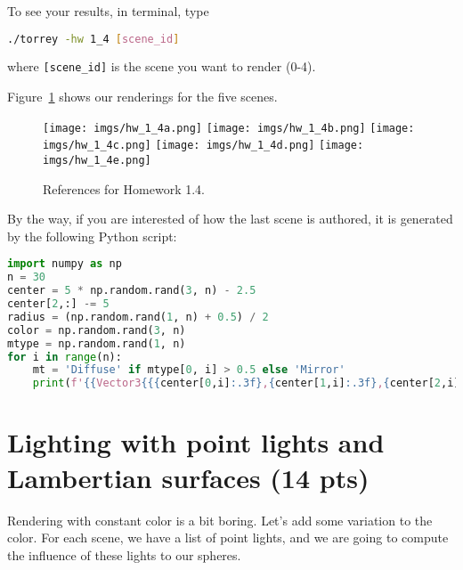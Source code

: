 To see your results, in terminal, type
\begin{lstlisting}[language=bash]
  ./torrey -hw 1_4 [scene_id]
\end{lstlisting}
where \lstinline{[scene_id]} is the scene you want to render (0-4).

Figure~\ref{fig:hw_1_4} shows our renderings for the five scenes.

\begin{figure}[ht]
    \centering
    \texttt{[image: imgs/hw\_1\_4a.png]}
    \texttt{[image: imgs/hw\_1\_4b.png]}
    \texttt{[image: imgs/hw\_1\_4c.png]}
    \texttt{[image: imgs/hw\_1\_4d.png]}
    \texttt{[image: imgs/hw\_1\_4e.png]}
    \caption{References for Homework 1.4.}
    \label{fig:hw_1_4}
\end{figure}

By the way, if you are interested of how the last scene is authored, it is generated by the following Python script:
\begin{lstlisting}[language=Python]
import numpy as np
n = 30
center = 5 * np.random.rand(3, n) - 2.5
center[2,:] -= 5
radius = (np.random.rand(1, n) + 0.5) / 2
color = np.random.rand(3, n)
mtype = np.random.rand(1, n)
for i in range(n):
    mt = 'Diffuse' if mtype[0, i] > 0.5 else 'Mirror'
    print(f'{{Vector3{{{center[0,i]:.3f},{center[1,i]:.3f},{center[2,i]:.3f}}}, {radius[0, i]:.3f}, Vector3{{{color[0,i]:.3f},{color[1,i]:.3f},{color[2,i]:.3f}}}, MaterialType::{mt}}},')
\end{lstlisting}

\section{Lighting with point lights and Lambertian surfaces (14 pts)}
Rendering with constant color is a bit boring. Let's add some variation to the color. For each scene, we have a list of point lights, and we are going to compute the influence of these lights to our spheres.


